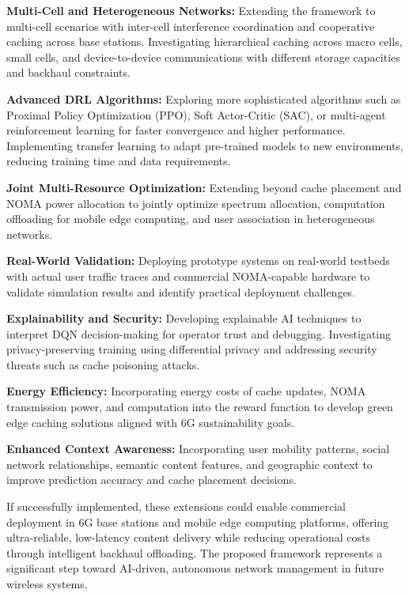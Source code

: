 \documentclass[12pt,a4paper]{article}
\begin{document}
\textbf{Multi-Cell and Heterogeneous Networks:} Extending the framework to multi-cell scenarios with inter-cell interference coordination and cooperative caching across base stations. Investigating hierarchical caching across macro cells, small cells, and device-to-device communications with different storage capacities and backhaul constraints.

\textbf{Advanced DRL Algorithms:} Exploring more sophisticated algorithms such as Proximal Policy Optimization (PPO), Soft Actor-Critic (SAC), or multi-agent reinforcement learning for faster convergence and higher performance. Implementing transfer learning to adapt pre-trained models to new environments, reducing training time and data requirements.

\textbf{Joint Multi-Resource Optimization:} Extending beyond cache placement and NOMA power allocation to jointly optimize spectrum allocation, computation offloading for mobile edge computing, and user association in heterogeneous networks.

\textbf{Real-World Validation:} Deploying prototype systems on real-world testbeds with actual user traffic traces and commercial NOMA-capable hardware to validate simulation results and identify practical deployment challenges.

\textbf{Explainability and Security:} Developing explainable AI techniques to interpret DQN decision-making for operator trust and debugging. Investigating privacy-preserving training using differential privacy and addressing security threats such as cache poisoning attacks.

\textbf{Energy Efficiency:} Incorporating energy costs of cache updates, NOMA transmission power, and computation into the reward function to develop green edge caching solutions aligned with 6G sustainability goals.

\textbf{Enhanced Context Awareness:} Incorporating user mobility patterns, social network relationships, semantic content features, and geographic context to improve prediction accuracy and cache placement decisions.

If successfully implemented, these extensions could enable commercial deployment in 6G base stations and mobile edge computing platforms, offering ultra-reliable, low-latency content delivery while reducing operational costs through intelligent backhaul offloading. The proposed framework represents a significant step toward AI-driven, autonomous network management in future wireless systems.
\end{document}
